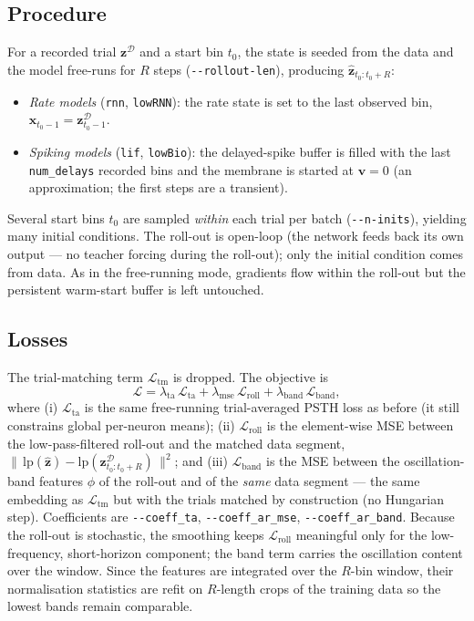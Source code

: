 \documentclass[11pt]{article}
\newcommand{\xvec}{\mathbf{x}}
\newcommand{\code}[1]{\texttt{#1}}
\begin{document}
\subsection{Procedure}
For a recorded trial $\mathbf{z}^{\mathcal{D}}$ and a start bin $t_0$, the state
is seeded from the data and the model free-runs for $R$ steps
(\code{-{}-rollout-len}), producing $\hat{\mathbf z}_{t_0:t_0+R}$:
\begin{itemize}[leftmargin=1.6em]
\item \emph{Rate models} (\code{rnn}, \code{lowRNN}): the rate state is set to the
last observed bin, $\xvec_{t_0-1} = \mathbf{z}^{\mathcal{D}}_{t_0-1}$.
\item \emph{Spiking models} (\code{lif}, \code{lowBio}): the delayed-spike buffer
is filled with the last \code{num\_delays} recorded bins and the membrane is
started at $\mathbf{v}=0$ (an approximation; the first steps are a transient).
\end{itemize}
Several start bins $t_0$ are sampled \emph{within} each trial per batch
(\code{-{}-n-inits}), yielding many initial conditions. The roll-out is open-loop
(the network feeds back its own output --- no teacher forcing during the roll-out);
only the initial condition comes from data. As in the free-running mode, gradients
flow within the roll-out but the persistent warm-start buffer is left untouched.

\subsection{Losses}
The trial-matching term $\mathcal{L}_{\mathrm{tm}}$ is dropped. The objective is
\begin{equation}
\mathcal{L} = \lambda_{\mathrm{ta}}\,\mathcal{L}_{\mathrm{ta}}
            + \lambda_{\mathrm{mse}}\,\mathcal{L}_{\mathrm{roll}}
            + \lambda_{\mathrm{band}}\,\mathcal{L}_{\mathrm{band}},
\end{equation}
where (i) $\mathcal{L}_{\mathrm{ta}}$ is the same free-running trial-averaged PSTH
loss as before (it still constrains global per-neuron means); (ii)
$\mathcal{L}_{\mathrm{roll}}$ is the element-wise MSE between the low-pass-filtered
roll-out and the matched data segment,
$\|\,\mathrm{lp}(\hat{\mathbf z}) - \mathrm{lp}(\mathbf z^{\mathcal{D}}_{t_0:t_0+R})\,\|^2$;
and (iii) $\mathcal{L}_{\mathrm{band}}$ is the MSE between the oscillation-band
features $\phi$ of the roll-out and of the \emph{same} data segment --- the same
embedding as $\mathcal{L}_{\mathrm{tm}}$ but with the trials matched by
construction (no Hungarian step). Coefficients are \code{-{}-coeff\_ta},
\code{-{}-coeff\_ar\_mse}, \code{-{}-coeff\_ar\_band}. Because the roll-out is
stochastic, the smoothing keeps $\mathcal{L}_{\mathrm{roll}}$ meaningful only for
the low-frequency, short-horizon component; the band term carries the oscillation
content over the window. Since the features are integrated over the $R$-bin window,
their normalisation statistics are refit on $R$-length crops of the training data
so the lowest bands remain comparable.
\end{document}
